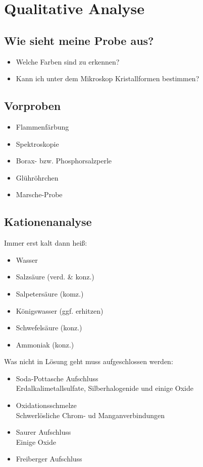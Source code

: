 \documentclass{article}
\begin{document}
\section{Qualitative Analyse}
\subsection{Wie sieht meine Probe aus?}
\begin{itemize}
    \item Welche Farben sind zu erkennen?
    \item Kann ich unter dem Mikroskop Kristallformen bestimmen?
\end{itemize}
\subsection{Vorproben}
\begin{itemize}
    \item Flammenfärbung
    \item Spektroskopie
    \item Borax- bzw. Phosphorsalzperle
    \item Glühröhrchen
    \item Marsche-Probe
\end{itemize}
\subsection{Kationenanalyse}
Immer erst kalt dann heiß:
\begin{itemize}
    \item Wasser
    \item Salzsäure (verd. \& konz.)
    \item Salpetersäure (komz.)
    \item Königswasser (ggf. erhitzen)
    \item Schwefelsäure (konz.)
    \item Ammoniak (konz.)
\end{itemize}
Was nicht in Lösung geht muss aufgeschlossen werden:
\begin{itemize}
    \item Soda-Pottasche Aufschluss\\Erdalkalimetallsulfate, Silberhalogenide und einige Oxide
    \item Oxidationsschmelze\\Schwerlösliche Chrom- ud Manganverbindungen
    \item Saurer Aufschluss\\Einige Oxide
    \item Freiberger Aufschluss\\
\end{itemize}
\end{document}
